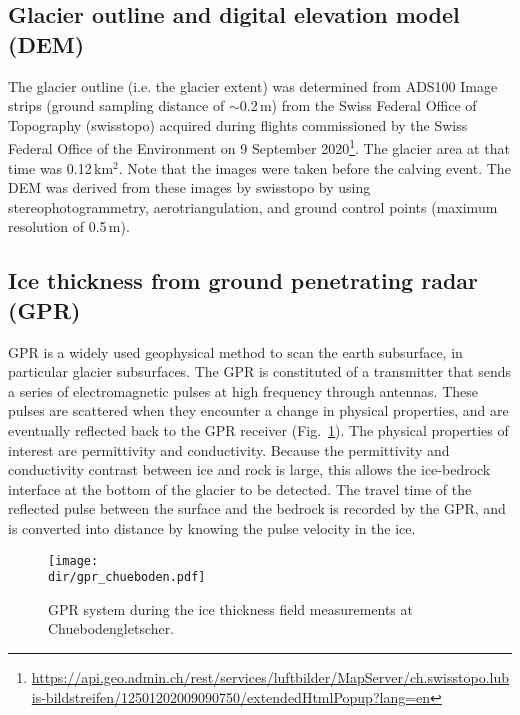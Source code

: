 \subsection{Glacier outline and digital elevation model (DEM)}
\label{subsection:glacierarea}

The glacier outline (i.e. the glacier extent) was determined from ADS100 Image strips (ground sampling distance of $\sim$0.2\,m) from the Swiss Federal Office of Topography (swisstopo) acquired during flights commissioned by the Swiss Federal Office of the Environment on 9 September 2020\footnote{\url{https://api.geo.admin.ch/rest/services/luftbilder/MapServer/ch.swisstopo.lubis-bildstreifen/12501202009090750/extendedHtmlPopup?lang=en}}. The glacier area at that time was 0.12\,km$^2$. Note that the images were taken before the calving event. The DEM was derived from these images by swisstopo by using stereophotogrammetry, aerotriangulation, and ground control points (maximum resolution of 0.5\,m).

\subsection{Ice thickness from ground penetrating radar (GPR)}

GPR is a widely used geophysical method to scan the earth subsurface, in particular glacier subsurfaces. The GPR is constituted of a transmitter that sends a series of electromagnetic pulses at high frequency through antennas. These pulses are scattered when they encounter a change in physical properties, and are eventually reflected back to the GPR receiver (Fig.~\ref{fig:gpr}). The physical properties of interest are permittivity and conductivity. Because the permittivity and conductivity contrast between ice and rock is large, this allows the ice-bedrock interface at the bottom of the glacier to be detected. The travel time of the reflected pulse between the surface and the bedrock is recorded by the GPR, and is converted into distance by knowing the pulse velocity in the ice. 

\begin{figure}
\centering
\texttt{[image: \\dir/gpr\_chueboden.pdf]}
\caption{GPR system during the ice thickness field measurements at Chuebodengletscher.}
\label{fig:gpr}
\end{figure}

